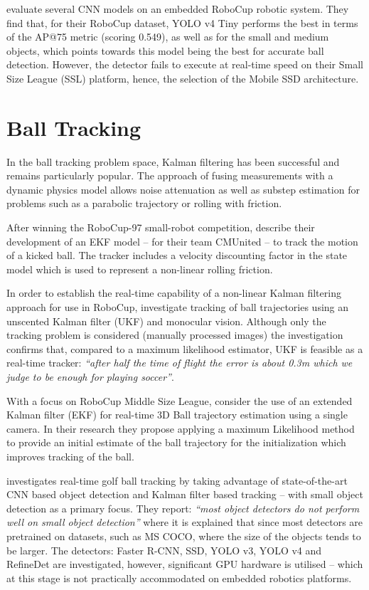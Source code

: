 \documentclass[a4paper,twoside,12pt]{report}
\begin{document}
\cite{robocupdataset} evaluate several CNN models on an embedded RoboCup robotic system. They find that, for their RoboCup dataset, YOLO v4 Tiny performs the best in terms of the AP@75 metric (scoring 0.549), as well as for the small and medium objects, which points towards this model being the best for accurate ball detection. However, the detector fails to execute at real-time speed on their Small Size League (SSL) platform, hence, the selection of the Mobile SSD architecture.

\section{Ball Tracking}
\label{section:balltracking}

In the ball tracking problem space, Kalman filtering has been successful and remains particularly popular. The approach of fusing measurements with a dynamic physics model allows noise attenuation as well as substep estimation for problems such as a parabolic trajectory or rolling with friction.

After winning the RoboCup-97 small-robot competition, \cite{kalmanmodel} describe their development of an EKF model -- for their team CMUnited -- to track the motion of a kicked ball. The tracker includes a velocity discounting factor in the state model which is used to represent a non-linear rolling friction. 

In order to establish the real-time capability of a non-linear Kalman filtering approach for use in RoboCup, \cite{robocuptrack} investigate tracking of ball trajectories using an unscented Kalman filter (UKF) and monocular vision. Although only the tracking problem is considered (manually processed images) the investigation confirms that, compared to a maximum likelihood estimator, UKF is feasible as a real-time tracker: \textit{``after half the time of flight the error is about 0.3m which we judge to be enough for playing soccer''}.

With a focus on RoboCup Middle Size League, \cite{3dparabola} consider the use of an extended Kalman filter (EKF) for real-time 3D Ball trajectory estimation using a single camera. In their research they propose applying a maximum Likelihood method to provide an initial estimate of the ball trajectory for the initialization which improves tracking of the ball.

\cite{golftrack} investigates real-time golf ball tracking by taking advantage of state-of-the-art CNN based object detection and Kalman filter based tracking -- with small object detection as a primary focus. They report: \textit{``most object detectors do not perform well on small object detection''} where it is explained that since most detectors are pretrained on datasets, such as MS COCO, where the size of the objects tends to be larger. The detectors: Faster R-CNN, SSD, YOLO v3, YOLO v4 and RefineDet are investigated, however, significant GPU hardware is utilised -- which at this stage is not practically accommodated on embedded robotics platforms. 
\end{document}
